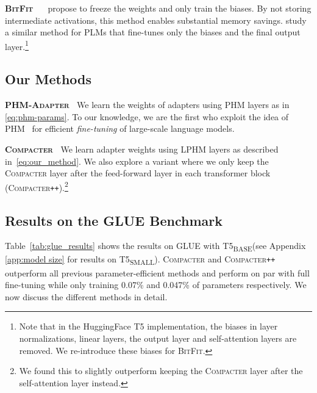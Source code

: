 \documentclass{article}
\newcommand{\basebase}{T5\textsubscript{\tiny BASE}\xspace}
\newcommand{\basesmall}{T5\textsubscript{\tiny SMALL}\xspace}
\newcommand{\compacter}{\textsc{Compacter}\xspace}
\newcommand{\compacteronlyff}{\textsc{Compacter}\texttt{++}\xspace} %
\newcommand{\phmadapter}{\textsc{PHM-Adapter}\xspace}
\newcommand{\glue}{\textsc{GLUE}\xspace}
\newcommand{\bitfit}{\textsc{BitFit}\xspace}
\begin{document}
\textbf{\bitfit} $\:$ ~\citet{cai2020tinytl} propose to freeze the weights and only train the biases. By not storing intermediate activations, this method enables substantial memory savings. \citet{ravfogel2021bitfit} study a similar method for PLMs that fine-tunes only the biases and the final output layer.\footnote{Note that in the HuggingFace T5 implementation, the biases in layer normalizations, linear layers, the output layer and self-attention layers are removed. We re-introduce these biases for \bitfit.} 

\subsection{Our Methods}

\textbf{\phmadapter} $\:$ We learn the weights of adapters using PHM layers as in \eqref{eq:phm-params}. To our knowledge, we are the first who exploit the idea of PHM~\citep{zhang2021beyond} for efficient \emph{fine-tuning} of large-scale language models. 

\textbf{\compacter} $\:$ We learn adapter weights using LPHM layers as described in~\eqref{eq:our_method}. We also explore a variant where we only keep the \compacter layer after the feed-forward layer in each transformer block (\compacteronlyff).\footnote{We found this to slightly outperform keeping the \compacter layer after the self-attention layer instead.}


\subsection{Results on the GLUE Benchmark}

Table~\ref{tab:glue_results} shows the results on \glue with \basebase\xspace (see Appendix \ref{app:model size} for results on \basesmall). \compacter and \compacteronlyff outperform all previous parameter-efficient methods and perform on par with full fine-tuning while only training 0.07\% and 0.047\% of parameters respectively. We now discuss the different methods in detail.
\end{document}

